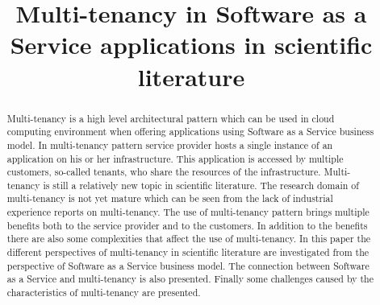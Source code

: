 \documentclass[conference]{sasmoota2017}
\begin{document}
%
\title{Multi-tenancy in Software as a Service applications in scientific literature}


\author{
}


\maketitle

\begin{abstract}

Multi-tenancy is a high level architectural pattern which can be used in cloud computing environment when offering applications using Software as a Service business model. In multi-tenancy pattern service provider hosts a single instance of an application on his or her infrastructure. This application is accessed by multiple customers, so-called tenants, who share the resources of the infrastructure. Multi-tenancy is still a relatively new topic in scientific literature. The research domain of multi-tenancy is not yet mature which can be seen from the lack of industrial experience reports on multi-tenancy. The use of multi-tenancy pattern brings multiple benefits both to the service provider and to the customers. In addition to the benefits there are also some complexities that affect the use of multi-tenancy. In this paper the different perspectives of multi-tenancy in scientific literature are investigated from the perspective of Software as a Service business model. The connection between Software as a Service and multi-tenancy is also presented. Finally some challenges caused by the characteristics of multi-tenancy are presented. 

\end{abstract}
\end{document}
